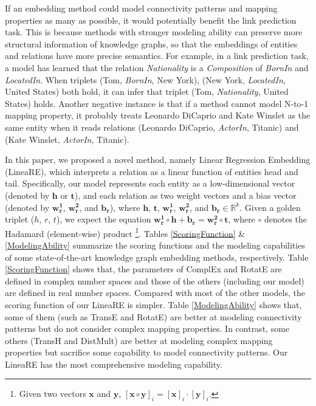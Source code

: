 \documentclass[conference]{IEEEtran}
\begin{document}
If an embedding method could model connectivity patterns and mapping properties as many as possible, it would potentially benefit the link prediction task. This is because methods with stronger modeling ability can preserve more structural information of knowledge graphs, so that the embeddings of entities and relations have more precise semantics. For example, in a link prediction task, a model has learned that the relation \textit{Nationality} is a \textit{Composition} of \textit{BornIn} and \textit{LocatedIn}. When triplets (Tom, \textit{BornIn}, New York), (New York, \textit{LocatedIn}, United States) both hold, it can infer that triplet (Tom, \textit{Nationality}, United States) holds. Another negative instance is that if a method cannot model N-to-1 mapping property, it probably treats Leonardo DiCaprio and Kate Winslet as the same entity when it reads relations (Leonardo DiCaprio, \textit{ActorIn}, Titanic) and (Kate Winslet, \textit{ActorIn}, Titanic).

In this paper, we proposed a novel method, namely Linear Regression Embedding (LineaRE), which interprets a relation as a linear function of entities head and tail. Specifically, our model represents each entity as a low-dimensional vector (denoted by $\bm{h}$ or $\bm{t}$), and each relation as two weight vectors and a bias vector (denoted by $\bm{w_{r}^{1}}$, $\bm{w_{r}^{2}}$, and $\bm{b_r}$), where $\bm{h}$, $\bm{t}$, $\bm{w_{r}^{1}}$, $\bm{w_{r}^{2}}$, and $\bm{b_r} \in \mathbb{R}^{k}$. Given a golden triplet ($h$, $r$, $t$), we expect the equation
$
	\bm{w_{r}^{1}} \circ \bm{h}
	+
	\bm{b_r}
	=
	\bm{w_{r}^{2}} \circ \bm{t}
$,
where $\circ$ denotes the Hadamard (element-wise) product
\footnote{
	Given two vectors $\bm{x}$ and $\bm{y}$, $[\bm{x} \circ \bm{y}]_i = [\bm{x}]_i \cdot [\bm{y}]_i$.
}. Tables \ref{ScoringFunction} \& \ref{ModelingAbility} summarize the scoring functions and the modeling capabilities of some state-of-the-art knowledge graph embedding methods, respectively. Table \ref{ScoringFunction} shows that, the parameters of ComplEx and RotatE are defined in complex number spaces and those of the others (including our model) are defined in real number spaces. Compared with most of the other models, the scoring function of our LineaRE is simpler. Table \ref{ModelingAbility} shows that, some of them (such as TransE and RotatE) are better at modeling connectivity patterns but do not consider complex mapping properties. In contrast, some others (TransH and DistMult) are better at modeling complex mapping properties but sacrifice some capability to model connectivity patterns. Our LineaRE has the most comprehensive modeling capability.
\end{document}
